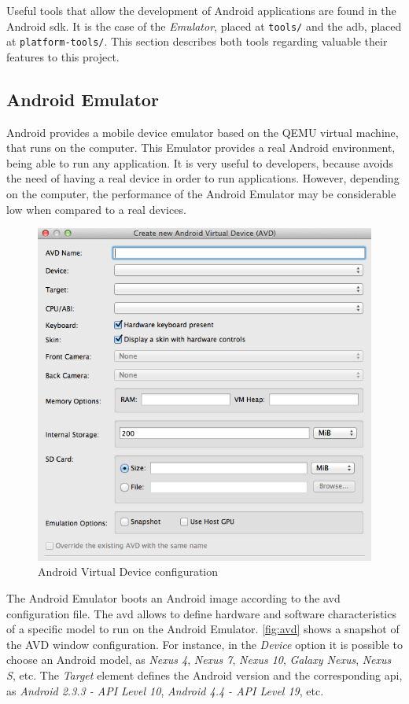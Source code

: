 Useful tools that allow the development of Android applications are found in the Android \gls{sdk}. It is the case of the \textit{Emulator}, placed at \texttt{tools/} and the \gls{adb}, placed at \texttt{platform-tools/}. This section describes both tools regarding valuable their features to this project.

\subsection{Android Emulator}

Android provides a mobile device emulator based on the QEMU virtual machine, that runs on the computer. This Emulator provides a real Android environment, being able to run any application. It is very useful to developers, because avoids the need of having a real device in order to run applications. However, depending on the computer, the performance of the Android Emulator may be considerable low when compared to a real devices.

\begin{figure}[h]
 \centering
 \includegraphics[scale=0.5]{figures/avd.png}
 \caption{Android Virtual Device configuration}
 \label{fig:avd}
\end{figure}

The Android Emulator boots an Android image according to the \gls{avd} configuration file. The \gls{avd} allows to define hardware and software characteristics of a specific model to run on the Android Emulator. \autoref{fig:avd} shows a snapshot of the \gls{AVD} window configuration. For instance, in the \textit{Device} option it is possible to choose an Android model, as \textit{Nexus 4}, \textit{Nexus 7}, \textit{Nexus 10}, \textit{Galaxy Nexus}, \textit{Nexus S}, etc. The \textit{Target} element defines the Android version and the corresponding \gls{api}, as \textit{Android 2.3.3 - API Level 10}, \textit{Android 4.4 - API Level 19}, etc.

